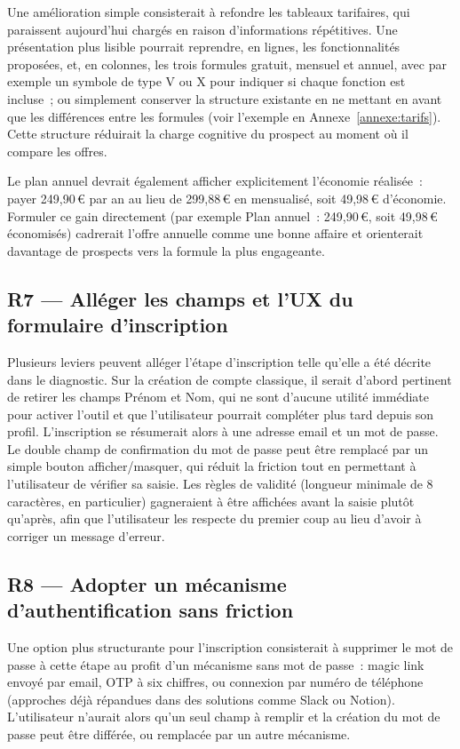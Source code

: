 \documentclass[12pt, a4paper]{article}
\newcounter{annexe}
\begin{document}
Une amélioration simple consisterait à refondre les tableaux tarifaires, qui paraissent aujourd'hui
chargés en raison d'informations répétitives. Une présentation plus lisible pourrait reprendre, en
lignes, les fonctionnalités proposées, et, en colonnes, les trois formules \og{}gratuit\fg{},
\og{}mensuel\fg{} et \og{}annuel\fg{}, avec par exemple un symbole de type V ou X pour indiquer si chaque
fonction est incluse~; ou simplement conserver la structure existante en ne mettant en avant que les 
différences entre les formules (voir l'exemple en Annexe~\ref{annexe:tarifs}). 
Cette structure réduirait la charge cognitive du prospect au moment où il
compare les offres.

Le plan annuel devrait également afficher explicitement l'économie réalisée~: payer 249,90\,€ par an
au lieu de 299,88\,€ en mensualisé, soit 49,98\,€ d'économie. 
Formuler ce gain directement (par exemple \og{}Plan annuel~: 249,90\,€, soit 49,98\,€ 
économisés\fg{}) cadrerait l'offre annuelle comme une bonne affaire et orienterait 
davantage de prospects vers la formule la plus engageante.

\subsection{R7 — Alléger les champs et l'UX du formulaire d'inscription}
Plusieurs leviers peuvent alléger l'étape d'inscription telle qu'elle a été décrite dans
le diagnostic. Sur la création de compte classique, il serait d'abord pertinent de retirer
les champs Prénom et Nom, qui ne sont d'aucune utilité immédiate pour activer l'outil et que
l'utilisateur pourrait compléter plus tard depuis son profil. L'inscription se résumerait alors
à une adresse email et un mot de passe. Le double champ de confirmation du mot de passe peut
être remplacé par un simple bouton afficher/masquer, qui réduit la friction tout en permettant
à l'utilisateur de vérifier sa saisie. Les règles de validité (longueur minimale de 8
caractères, en particulier) gagneraient à être affichées avant la saisie plutôt qu'après, afin
que l'utilisateur les respecte du premier coup au lieu d'avoir à corriger un message d'erreur.

\subsection{R8 — Adopter un mécanisme d'authentification sans friction}

Une option plus structurante pour l'inscription consisterait à supprimer le mot de passe à cette étape au profit
d'un mécanisme sans mot de passe~: magic link envoyé par email, OTP à six chiffres, ou connexion
par numéro de téléphone (approches déjà répandues dans des solutions comme Slack ou Notion).
L'utilisateur n'aurait alors qu'un seul champ à remplir et la création du mot de passe peut être
différée, ou remplacée par un autre mécanisme.
\end{document}
